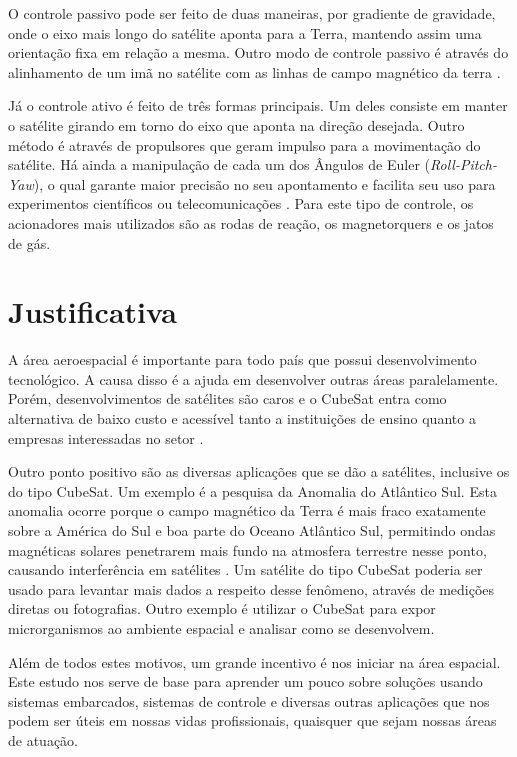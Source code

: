 \documentclass[
	12pt,				%
	openany,			%
	twoside,			%
	a4paper,			%
	english,			%
	french,				%
	spanish,			%
	brazil,				%
	oldfontcommands
	]{abntex2}
\begin{document}
O controle passivo pode ser feito de duas maneiras, por gradiente de gravidade, onde o eixo mais longo do satélite aponta para a Terra, mantendo assim uma orientação fixa em relação a mesma. Outro modo de controle passivo é através do alinhamento de um imã no satélite com as linhas de campo magnético da terra \cite{FrancLav}.

Já o controle ativo é feito de três formas principais. Um deles consiste em manter o satélite girando em torno do eixo que aponta na direção desejada. Outro método é através de propulsores que geram impulso para a movimentação do satélite. Há ainda a manipulação de cada um dos Ângulos de Euler (\textit{Roll-Pitch-Yaw}), o qual garante maior precisão no seu apontamento e facilita seu uso para experimentos científicos ou telecomunicações \cite{FrancLav}. Para este tipo de controle, os acionadores mais utilizados são as rodas de reação, os magnetorquers e os jatos de gás.

\section{Justificativa}

	A área aeroespacial é importante para todo país que possui desenvolvimento tecnológico. A causa disso é a ajuda em desenvolver outras áreas paralelamente. Porém, desenvolvimentos de satélites são caros e o CubeSat entra como alternativa de baixo custo e acessível tanto a instituições de ensino quanto a empresas interessadas no setor \cite{DIY}.
	
Outro ponto positivo são as diversas aplicações que se dão a satélites, inclusive os do tipo CubeSat. Um exemplo é a pesquisa da Anomalia do Atlântico Sul. Esta anomalia ocorre porque o campo magnético da Terra é mais fraco exatamente sobre a América do Sul e boa parte do Oceano Atlântico Sul, permitindo ondas magnéticas solares penetrarem mais fundo na atmosfera terrestre nesse ponto, causando interferência em satélites \cite{MORAES}. Um satélite do tipo CubeSat poderia ser usado para levantar mais dados a respeito desse fenômeno, através de medições diretas ou fotografias. Outro exemplo é utilizar o CubeSat para expor microrganismos ao ambiente espacial e analisar como se desenvolvem.

Além de todos estes motivos, um grande incentivo é nos iniciar na área espacial. Este estudo nos serve de base para aprender um pouco sobre soluções usando sistemas embarcados, sistemas de controle e diversas outras aplicações que nos podem ser úteis em nossas vidas profissionais, quaisquer que sejam nossas áreas de atuação.
\end{document}
